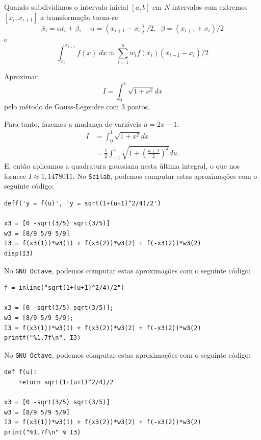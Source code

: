 Quando subdividimos o intervalo inicial $[a,b]$ em $N$ intervalos com extremos $[x_i,x_{i+1}]$ a transformação torna-se
$$
  \bar{x}_i = \alpha t_i + \beta, \;\;  \;\; \alpha =(x_{i+1}-x_i)/2, \;\; \beta = (x_{i+1}+x_i)/2
$$
e
$$
 \int_{x_i}^{x_{i+1}} f(x) \; dx \approx \sum_{i=1}^n w_i f( \bar{x}_i ) (x_{i+1}-x_i)/2
$$

\begin{ex} Aproximar
$$I = \int_{0}^1\sqrt{1+x^2}dx$$
pelo método de Gauss-Legendre com 3 pontos.
\end{ex}
\begin{sol}
Para tanto, fazemos a mudança de variáveis $u=2x-1$:
\begin{equation*}
  \begin{split}
    I &= \int_{0}^1\sqrt{1+x^2}dx\\
    &= \frac{1}{2}\int_{-1}^1\sqrt{1+\left(\frac{u+1}{2}\right)^2}du.
  \end{split}
\end{equation*}
E, então aplicamos a quadratura gaussiana nesta última integral, o que nos fornece $I \approx 1,1478011$.
\ifisscilab
No \verb+Scilab+, podemos computar estas aproximações com o seguinte código:
\begin{verbatim}
deff('y = f(u)', 'y = sqrt(1+(u+1)^2/4)/2')

x3 = [0 -sqrt(3/5) sqrt(3/5)]
w3 = [8/9 5/9 5/9]
I3 = f(x3(1))*w3(1) + f(x3(2))*w3(2) + f(-x3(2))*w3(2)
disp(I3)
\end{verbatim}
\fi
\ifisoctave
No \verb+GNU Octave+, podemos computar estas aproximações com o seguinte código:
\begin{verbatim}
f = inline("sqrt(1+(u+1)^2/4)/2")

x3 = [0 -sqrt(3/5) sqrt(3/5)];
w3 = [8/9 5/9 5/9];
I3 = f(x3(1))*w3(1) + f(x3(2))*w3(2) + f(-x3(2))*w3(2)
printf("%1.7f\n", I3)
\end{verbatim}
\fi
\ifispython
No \verb+GNU Octave+, podemos computar estas aproximações com o seguinte código:
\begin{verbatim}
def f(u):
    return sqrt(1+(u+1)^2/4)/2

x3 = [0 -sqrt(3/5) sqrt(3/5)]
w3 = [8/9 5/9 5/9]
I3 = f(x3(1))*w3(1) + f(x3(2))*w3(2) + f(-x3(2))*w3(2)
print("%1.7f\n" % I3)
\end{verbatim}
\fi
\end{sol}


